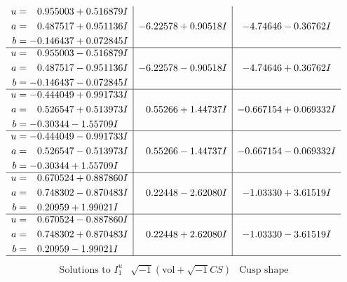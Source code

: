 \documentclass[1p]{elsarticle_modified}
\theoremstyle{definition}
\newcommand{\I}{\sqrt{-1}}
\begin{document}
$$\begin{array}{c|c|c}
\begin{aligned}
u &= \phantom{-}0.955003 + 0.516879 I \\
a &= \phantom{-}0.487517 + 0.951136 I \\
b &= -0.146437 + 0.072845 I\end{aligned}
 & -6.22578 + 0.90518 I & -4.74646 - 0.36762 I \\ \hline\begin{aligned}
u &= \phantom{-}0.955003 - 0.516879 I \\
a &= \phantom{-}0.487517 - 0.951136 I \\
b &= -0.146437 - 0.072845 I\end{aligned}
 & -6.22578 - 0.90518 I & -4.74646 + 0.36762 I \\ \hline\begin{aligned}
u &= -0.444049 + 0.991733 I \\
a &= \phantom{-}0.526547 + 0.513973 I \\
b &= -0.30344 - 1.55709 I\end{aligned}
 & \phantom{-}0.55266 + 1.44737 I & -0.667154 + 0.069332 I \\ \hline\begin{aligned}
u &= -0.444049 - 0.991733 I \\
a &= \phantom{-}0.526547 - 0.513973 I \\
b &= -0.30344 + 1.55709 I\end{aligned}
 & \phantom{-}0.55266 - 1.44737 I & -0.667154 - 0.069332 I \\ \hline\begin{aligned}
u &= \phantom{-}0.670524 + 0.887860 I \\
a &= \phantom{-}0.748302 - 0.870483 I \\
b &= \phantom{-}0.20959 + 1.99021 I\end{aligned}
 & \phantom{-}0.22448 - 2.62080 I & -1.03330 + 3.61519 I \\ \hline\begin{aligned}
u &= \phantom{-}0.670524 - 0.887860 I \\
a &= \phantom{-}0.748302 + 0.870483 I \\
b &= \phantom{-}0.20959 - 1.99021 I\end{aligned}
 & \phantom{-}0.22448 + 2.62080 I & -1.03330 - 3.61519 I\\
 \hline 
 \end{array}$$\newpage$$\begin{array}{c|c|c}  
\text{Solutions to }I^u_{1}& \I (\text{vol} + \sqrt{-1}CS) & \text{Cusp shape}\\

\end{array}$$
\end{document}
